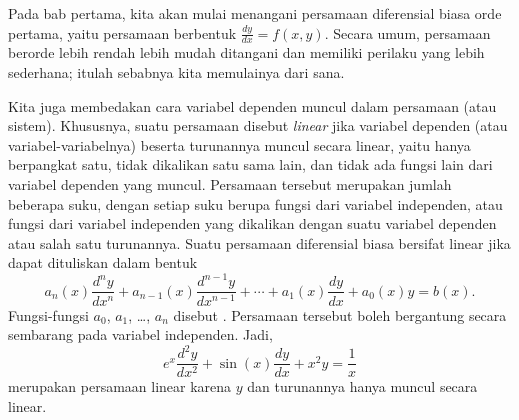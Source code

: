 Pada bab pertama, kita akan mulai menangani persamaan diferensial biasa
orde pertama, yaitu persamaan berbentuk $\frac{dy}{dx} = f(x,y)$.
Secara umum, persamaan berorde lebih rendah lebih mudah ditangani dan memiliki
perilaku yang lebih sederhana; itulah sebabnya kita memulainya dari sana.

\medskip

Kita juga membedakan cara variabel dependen muncul dalam persamaan (atau sistem).
Khususnya, suatu persamaan disebut
\emph{linear} jika variabel dependen (atau variabel-variabelnya)
beserta turunannya muncul secara linear, yaitu hanya berpangkat satu, tidak
dikalikan satu sama lain, dan tidak ada fungsi lain dari variabel dependen yang
muncul. Persamaan tersebut merupakan jumlah beberapa suku, dengan setiap suku
berupa fungsi dari variabel independen, atau fungsi dari variabel independen yang
dikalikan dengan suatu variabel dependen atau salah satu turunannya.
Suatu persamaan diferensial biasa bersifat linear jika dapat dituliskan dalam bentuk
\begin{equation} \label{classification:eqlingen}
a_n(x) \frac{d^n y}{dx^n} +
a_{n-1}(x) \frac{d^{n-1} y}{dx^{n-1}} +
\cdots
+
a_{1}(x) \frac{dy}{dx}
+
a_{0}(x) y = b(x) .
\end{equation}
Fungsi-fungsi $a_0$, $a_1$, \ldots, $a_n$ disebut
\emph{}.
Persamaan tersebut boleh bergantung secara sembarang pada variabel independen.
Jadi,
\begin{equation} \label{classification:eqlinex}
e^x \frac{d^2 y}{dx^2} +
\sin(x) \frac{d y}{dx} +
x^2 y
=
\frac{1}{x}
\end{equation}
merupakan persamaan linear karena $y$ dan turunannya hanya muncul secara linear.


